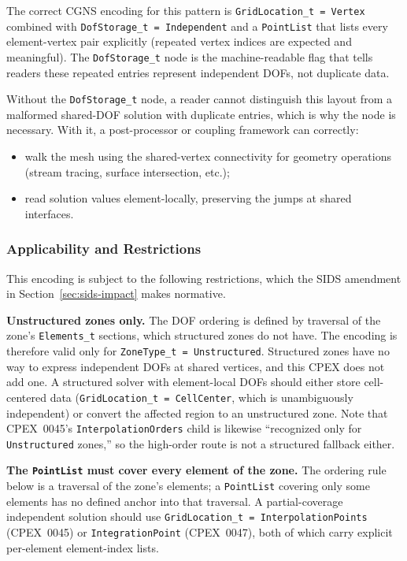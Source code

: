 \documentclass[11pt,letterpaper]{article}
\begin{document}
The correct CGNS encoding for this pattern is
\texttt{GridLocation\_t = Vertex} combined with
\texttt{DofStorage\_t = Independent} and a
\texttt{PointList} that lists every element-vertex pair explicitly
(repeated vertex indices are expected and meaningful).  The
\texttt{DofStorage\_t} node is the machine-readable flag that
tells readers these repeated entries represent independent DOFs, not
duplicate data.

Without the \texttt{DofStorage\_t} node, a reader cannot
distinguish this layout from a malformed shared-DOF solution with
duplicate entries, which is why the node is necessary.  With it, a
post-processor or coupling framework can correctly:

\begin{itemize}[leftmargin=2em]
\item walk the mesh using the shared-vertex connectivity for geometry
  operations (stream tracing, surface intersection, etc.);
\item read solution values element-locally, preserving the jumps at
  shared interfaces.
\end{itemize}

\subsubsection{Applicability and Restrictions}
\label{sec:ptlist-restrictions}

This encoding is subject to the following restrictions, which the
SIDS amendment in Section~\ref{sec:sids-impact} makes normative.

\textbf{Unstructured zones only.}  The DOF ordering is defined by
traversal of the zone's \texttt{Elements\_t} sections, which structured
zones do not have.  The encoding is therefore valid only for
\texttt{ZoneType\_t = Unstructured}.  Structured zones have no way to
express independent DOFs at shared vertices, and this CPEX does not
add one.  A structured solver with element-local DOFs should either
store cell-centered data (\texttt{GridLocation\_t = CellCenter}, which
is unambiguously independent) or convert the affected region to an
unstructured zone.  Note that CPEX~0045's \texttt{InterpolationOrders}
child is likewise ``recognized only for \texttt{Unstructured}
zones,'' so the high-order route is not a structured fallback either.

\textbf{The \texttt{PointList} must cover every element of the zone.}
The ordering rule below is a traversal of the zone's elements; a
\texttt{PointList} covering only some elements has no defined anchor
into that traversal.  A partial-coverage independent solution should
use \texttt{GridLocation\_t = InterpolationPoints} (CPEX~0045) or
\texttt{IntegrationPoint} (CPEX~0047), both of which carry explicit
per-element element-index lists.
\end{document}
